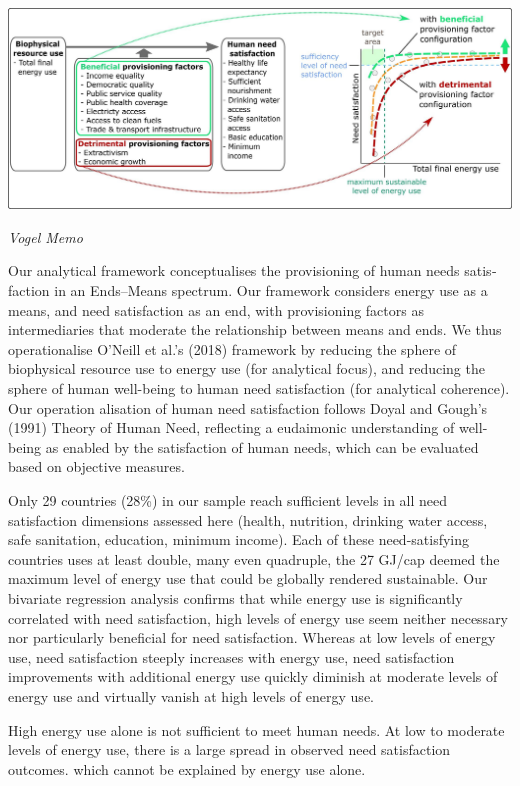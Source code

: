 \documentclass[
]{book}
\begin{document}
\includegraphics{fig/Vogel_framework.jpg}

\emph{Vogel Memo}

Our analytical framework conceptualises the provisioning of human needs satis­
faction in an Ends--Means spectrum. Our framework
considers energy use as a means, and need satisfaction as an end, with
provisioning factors as intermediaries that moderate the relationship
between means and ends. We thus operationalise O'Neill et al.'s (2018)
framework by reducing the sphere of biophysical resource use to energy
use (for analytical focus), and reducing the sphere of human well-being
to human need satisfaction (for analytical coherence). Our operation­
alisation of human need satisfaction follows Doyal and Gough's (1991)
Theory of Human Need, reflecting a eudaimonic understanding of well-
being as enabled by the satisfaction of human needs, which can be
evaluated based on objective measures.

Only 29 countries (28\%) in our sample reach sufficient levels in all
need satisfaction dimensions assessed here (health, nutrition, drinking
water access, safe sanitation, education, minimum income). Each of
these need-satisfying countries uses at least double, many even
quadruple, the 27 GJ/cap deemed the maximum level of energy use that
could be globally rendered sustainable.
Our bivariate regression analysis confirms that while energy use is
significantly correlated with need satisfaction, high levels of energy use
seem neither necessary nor particularly beneficial for need satisfaction.
Whereas at low levels of energy use, need satisfaction steeply increases
with energy use, need satisfaction improvements with additional energy
use quickly diminish at moderate levels of energy use and virtually vanish
at high levels of energy use.

High energy use alone is not
sufficient to meet human needs. At low to moderate levels of energy use,
there is a large spread in observed need satisfaction outcomes.
which cannot be explained by energy use alone.
\end{document}
